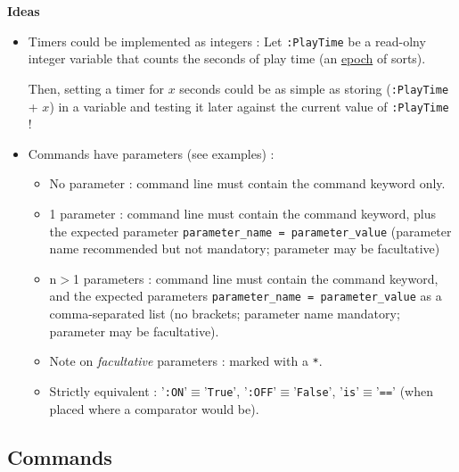 \documentclass[11pt]{article}
\begin{document}
\textbf{Ideas}
\begin{itemize}
	\item Timers could be implemented as integers : Let \verb|:PlayTime| be a read-olny integer variable that counts the seconds of play time (an \href{https://en.wikipedia.org/wiki/Epoch_(computing)}{epoch} of sorts).
	
	Then, setting a timer for $x$ seconds could be as simple as storing (\verb|:PlayTime| + $x$) in a variable and testing it later against the current value of \verb|:PlayTime| !
	
	\item Commands have parameters (see examples) :
	\begin{itemize}
		\item No parameter : command line must contain the command keyword only.
		\item 1 parameter : command line must contain the command keyword, plus the expected parameter \verb|parameter_name = parameter_value| (parameter name recommended but not mandatory; parameter may be facultative)
		\item n$>$1 parameters : command line must contain the command keyword, and the expected parameters \verb|parameter_name = parameter_value| as a comma-separated list (no brackets; parameter name mandatory; parameter may be facultative).
		\item Note on \textit{facultative} parameters : marked with a \verb|*|.
		\item Strictly equivalent : '\verb|:ON|'$\equiv$'\verb|True|', '\verb|:OFF|'$\equiv$'\verb|False|', '\verb|is|'$\equiv$'\verb|==|' (when placed where a comparator would be).
	\end{itemize}
\end{itemize}


\newpage
\subsection{Commands}
\end{document}
